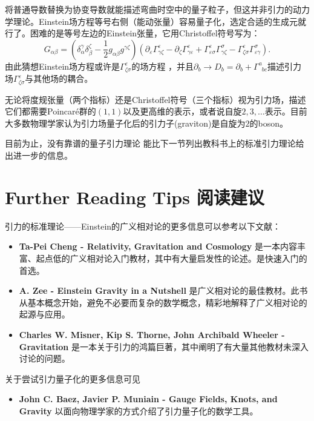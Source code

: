 将普通导数替换为协变导数就能描述弯曲时空中的量子粒子，但这并非引力的动力学理论。Einstein场方程等号右侧（能动张量）容易量子化，选定合适的生成元就行了。困难的是等号左边的Einstein张量，它用Christoffel符号写为：
\begin{equation}
\label{equ12.15}
    G_{\alpha \beta} = (\delta^\gamma_\alpha \delta^\zeta_\beta - \frac{1}{2} g_{\alpha \beta} g^{\gamma \zeta}) (\partial_\varepsilon \Gamma^\varepsilon_{\gamma \zeta} - \partial_\zeta \Gamma^\varepsilon_{\gamma \varepsilon} + \Gamma^\varepsilon_{\varepsilon \sigma} \Gamma^\sigma_{\gamma \zeta} - \Gamma^\varepsilon_{\zeta \sigma} \Gamma^\sigma_{\varepsilon \gamma}).
\end{equation}
由此猜想Einstein场方程或许是$\Gamma^\varepsilon_{\zeta \sigma}$的场方程%
%
，并且$\partial_b \to D_b = \partial_b + \Gamma^a_{\phantom{a} bc}$描述引力场$\Gamma^\varepsilon_{\zeta \sigma}$与其他场的耦合。

无论将度规张量（两个指标）还是Christoffel符号（三个指标）视为引力场，描述它们都需要Poincar\'e群的$(1, 1)$以及更高维的表示，或者说自旋$2, 3, \dots$表示。目前大多数物理学家认为引力场量子化后的引力子(graviton)是自旋为$2$的boson。

目前为止，没有靠谱的量子引力理论%
%
能比下一节列出教科书上的标准引力理论给出进一步的信息。

\section*{Further Reading Tips \quad 阅读建议}
引力的标准理论——Einstein的广义相对论的更多信息可以参考以下文献：
\begin{itemize}
    \item {\bf  Ta-Pei Cheng - Relativity, Gravitation and Cosmology}%
    是一本内容丰富、起点低的广义相对论入门教材，其中有大量启发性的论述。是快速入门的首选。
    \item {\bf  A. Zee - Einstein Gravity in a Nutshell}%
    是广义相对论的最佳教材。此书从基本概念开始，避免不必要而复杂的数学概念，精彩地解释了广义相对论的起源与应用。
    \item {\bf  Charles W. Misner, Kip S. Thorne, John Archibald Wheeler - Gravitation}%
    是一本关于引力的鸿篇巨著，其中阐明了有大量其他教材未深入讨论的问题。
\end{itemize}
关于尝试引力量子化的更多信息可见
\begin{itemize}
    \item {\bf John C. Baez, Javier P. Muniain - Gauge Fields, Knots, and Gravity}%
    以面向物理学家的方式介绍了引力量子化的数学工具。
\end{itemize}
